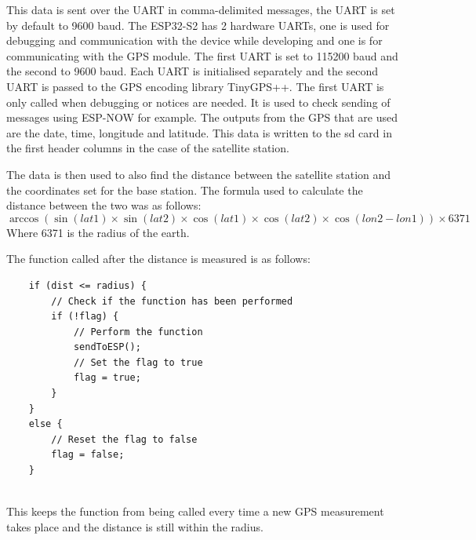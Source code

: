 \noindent
This data is sent over the UART in comma-delimited messages, the UART is set by default to 9600 baud.
The ESP32-S2 has 2 hardware UARTs, one is used for debugging and communication with the device while developing and one is for communicating with the GPS module. The first UART is set to 115200 baud and the second to 9600 baud. Each UART is initialised separately and the second UART is passed to the GPS encoding library TinyGPS++. The first UART is only called when debugging or notices are needed. It is used to check sending of messages using ESP-NOW for example.
The outputs from the GPS that are used are the date, time, longitude and latitude. This data is written to the sd card in the first header columns in the case of the satellite station.

\noindent
The data is then used to also find the distance between the satellite station and the coordinates set for the base station. The formula used to calculate the distance between the two was as follows:
\begin{equation}\label{eq:distance}
	\arccos(\sin(lat1)\times\sin(lat2)\times\cos(lat1)\times\cos(lat2)\times\cos(lon2-lon1)) \times 6371
\end{equation}
Where 6371 is the radius of the earth.

\noindent
The function called after the distance is measured is as follows:
	
\begin{lstlisting}
	if (dist <= radius) {
		// Check if the function has been performed
		if (!flag) {
			// Perform the function
			sendToESP();
			// Set the flag to true
			flag = true;
		}
	} 
	else {
		// Reset the flag to false
		flag = false;
	}   
	
\end{lstlisting}
This keeps the function from being called every time a new GPS measurement takes place and the distance is still within the radius.
